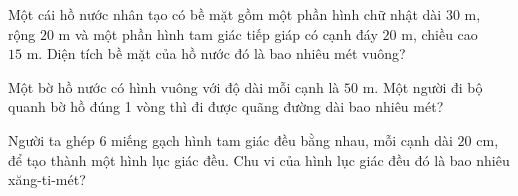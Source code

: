 \begin{ex} %
Một cái hồ nước nhân tạo có bề mặt gồm một phần hình chữ nhật dài $30\text{ m}$, rộng $20\text{ m}$ và một phần hình tam giác tiếp giáp có cạnh đáy $20\text{ m}$, chiều cao $15\text{ m}$. Diện tích bề mặt của hồ nước đó là bao nhiêu mét vuông?
\end{ex}

\begin{ex} %
Một bờ hồ nước có hình vuông với độ dài mỗi cạnh là $50\text{ m}$. Một người đi bộ quanh bờ hồ đúng 1 vòng thì đi được quãng đường dài bao nhiêu mét?
\end{ex}

\begin{ex} %
Người ta ghép 6 miếng gạch hình tam giác đều bằng nhau, mỗi cạnh dài $20\text{ cm}$, để tạo thành một hình lục giác đều. Chu vi của hình lục giác đều đó là bao nhiêu xăng-ti-mét?
\end{ex}
